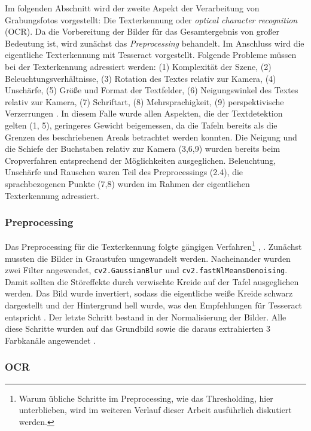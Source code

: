 Im folgenden Abschnitt wird der zweite Aspekt der Verarbeitung von Grabungsfotos vorgestellt: Die Texterkennung oder \textit{optical character recognition} (OCR). Da die Vorbereitung der Bilder für das Gesamtergebnis von großer Bedeutung ist, wird zunächst das \textit{Preprocessing} behandelt. Im Anschluss wird die eigentliche Texterkennung mit Tesseract vorgestellt.
Folgende Probleme müssen bei der Texterkennung adressiert werden: (1) Komplexität der Szene, (2) Beleuchtungsverhältnisse, (3) Rotation des Textes relativ zur Kamera, (4) Unschärfe, (5) Größe und Format der Textfelder, (6) Neigungswinkel des Textes relativ zur Kamera, (7) Schriftart, (8) Mehrsprachigkeit, (9) perspektivische Verzerrungen \cite{hamad}. In diesem Falle wurde allen Aspekten, die der Textdetektion gelten (1, 5), geringeres Gewicht beigemessen, da die Tafeln bereits als die Grenzen des beschriebenen Areals betrachtet werden konnten. Die Neigung und die Schiefe der Buchstaben relativ zur Kamera (3,6,9) wurden bereits beim Cropverfahren entsprechend der Möglichkeiten ausgeglichen. Beleuchtung, Unschärfe und Rauschen waren Teil des Preprocessings (2.4), die sprachbezogenen Punkte (7,8) wurden im Rahmen der eigentlichen Texterkennung adressiert.

\subsubsection{Preprocessing}

Das Preprocessing für die Texterkennung folgte gängigen Verfahren\footnote{Warum übliche Schritte im Preprocessing, wie das Thresholding, hier unterblieben, wird im weiteren Verlauf dieser Arbeit ausführlich diskutiert werden.} \cite{jenilshah}, \cite{sumedhahallale}. Zunächst mussten die Bilder in Graustufen umgewandelt werden. Nacheinander wurden zwei Filter angewendet, \verb|cv2.GaussianBlur| und \verb|cv2.fastNlMeansDenoising|. Damit sollten die Störeffekte durch verwischte Kreide auf der Tafel ausgeglichen werden. Das Bild wurde invertiert, sodass die eigentliche weiße Kreide schwarz dargestellt und der Hintergrund hell wurde, was den Empfehlungen für Tesseract entspricht \cite{tesseractoptimum}. Der letzte Schritt bestand in der Normalisierung der Bilder. Alle diese Schritte wurden auf das Grundbild sowie die daraus extrahierten 3 Farbkanäle angewendet \cite{xilinchen}.

\subsubsection{OCR}

